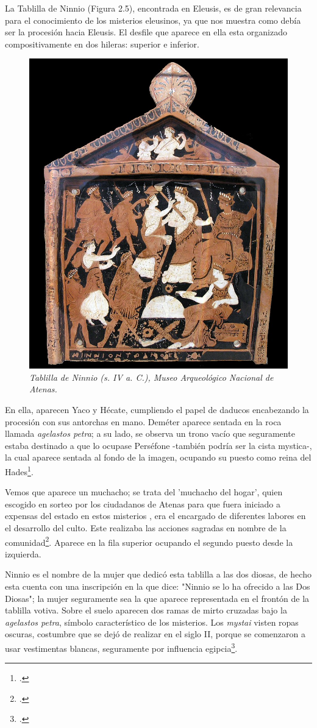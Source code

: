 La Tablilla de Ninnio (Figura 2.5), encontrada en Eleusis, es de gran relevancia para el conocimiento de los misterios eleusinos, ya que nos muestra como debía ser la procesión hacia Eleusis. El desfile que aparece en ella esta organizado compositivamente en dos hileras: superior e inferior.

\begin{figure}[h!]
	\centering
	\includegraphics[width=0.45\linewidth]{Imagenes/TablillaDeNinnio}
	\caption{\textit{Tablilla de Ninnio (s. IV a. C.), Museo Arqueológico Nacional de Atenas.}}
	\label{fig:tablilla de Ninnio}
\end{figure}

En ella, aparecen Yaco y Hécate, cumpliendo el papel de daducos encabezando la procesión con sus antorchas en mano. Deméter aparece sentada en la roca llamada \textit{agelastos petra}; a su lado, se observa un trono vacío que seguramente estaba destinado a que lo ocupase Perséfone -también podría ser la cista mystica-, la cual aparece sentada al fondo de la imagen, ocupando su puesto como reina del Hades\footcite[105-106]{kerenyiEleusisImagenArquetipica2004}. 

Vemos que aparece un muchacho; se trata del 'muchacho del hogar', quien escogido en sorteo por los ciudadanos de Atenas para que fuera iniciado a expensas del estado en estos misterios , era el encargado de diferentes labores en el desarrollo del culto. Este realizaba las acciones sagradas en nombre de la comunidad\footcite[105]{kerenyiEleusisImagenArquetipica2004}. Aparece en la fila superior ocupando el segundo puesto desde la izquierda. 

Ninnio es el nombre de la mujer que dedicó esta tablilla a las dos diosas, de hecho esta cuenta con una inscripción en la que dice: "Ninnio se lo ha ofrecido a las Dos Diosas"; la mujer seguramente sea la que aparece representada en el frontón de la tablilla votiva. Sobre el suelo aparecen dos ramas de mirto cruzadas bajo la \textit{agelastos petra}, símbolo característico de los misterios. Los \textit{mystai} visten ropas oscuras, costumbre que se dejó de realizar en el siglo II, porque se comenzaron a usar vestimentas blancas, seguramente por influencia egipcia\footcite[107]{kerenyiEleusisImagenArquetipica2004}. 

